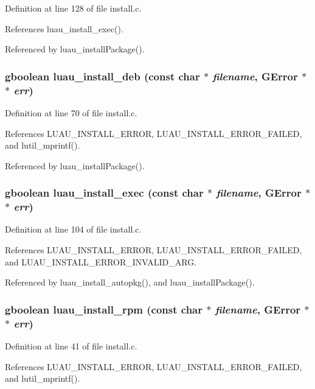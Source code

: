 Definition at line 128 of file install.c.

References luau\_\-install\_\-exec().

Referenced by luau\_\-install\-Package().
\subsubsection{\setlength{\rightskip}{0pt plus 5cm}gboolean luau\_\-install\_\-deb (const char $\ast$ {\em filename}, GError $\ast$$\ast$ {\em err})}\label{install_8c_a1}




Definition at line 70 of file install.c.

References LUAU\_\-INSTALL\_\-ERROR, LUAU\_\-INSTALL\_\-ERROR\_\-FAILED, and lutil\_\-mprintf().

Referenced by luau\_\-install\-Package().
\subsubsection{\setlength{\rightskip}{0pt plus 5cm}gboolean luau\_\-install\_\-exec (const char $\ast$ {\em filename}, GError $\ast$$\ast$ {\em err})}\label{install_8c_a3}




Definition at line 104 of file install.c.

References LUAU\_\-INSTALL\_\-ERROR, LUAU\_\-INSTALL\_\-ERROR\_\-FAILED, and LUAU\_\-INSTALL\_\-ERROR\_\-INVALID\_\-ARG.

Referenced by luau\_\-install\_\-autopkg(), and luau\_\-install\-Package().
\subsubsection{\setlength{\rightskip}{0pt plus 5cm}gboolean luau\_\-install\_\-rpm (const char $\ast$ {\em filename}, GError $\ast$$\ast$ {\em err})}\label{install_8c_a0}




Definition at line 41 of file install.c.

References LUAU\_\-INSTALL\_\-ERROR, LUAU\_\-INSTALL\_\-ERROR\_\-FAILED, and lutil\_\-mprintf().

